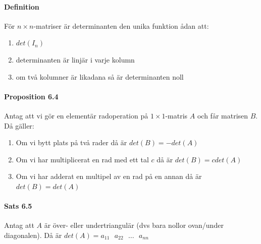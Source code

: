 \paragraph{Definition} För $n\times n$-matriser är determinanten den unika funktion ådan att:
\begin{enumerate}
    \item $det(I_{n})$
    \item determinanten är linjär i varje kolumn
    \item om två kolumner är likadana så är determinanten noll
\end{enumerate}

\paragraph{Proposition 6.4} Antag att vi gör en elementär radoperation på $1\times 1$-matris $A$ 
och får matrisen $B$. Då gäller:
\begin{enumerate}[label=\alph*]
    \item Om vi bytt plats på två rader då är $det(B)=-det(A)$
    \item Om vi har multiplicerat en rad med ett tal $c$ då är $det(B)=cdet(A)$
    \item Om vi har adderat en multipel av en rad på en annan då är $det(B)=det(A)$
\end{enumerate}

\paragraph{Sats 6.5} Antag att $A$ är över- eller undertriangulär (dvs bara nollor ovan/under diagonalen).
Då är $det(A)=a_{11}\text{ }a_{22}\text{ }\ldots\text{ }a_{nn}$

